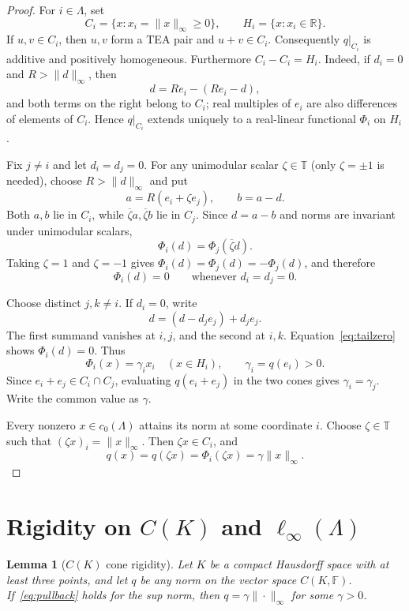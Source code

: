 \documentclass[11pt]{article}
\newtheorem{lemma}[theorem]{Lemma}
\newcommand{\F}{\mathbb F}
\newcommand{\Torus}{\mathbb T}
\begin{document}
\begin{proof}
For $i\in\Lambda$, set
\[
 C_i=\{x:x_i=\|x\|_\infty\ge0\},\qquad
 H_i=\{x:x_i\in\mathbb R\}.
\]
If $u,v\in C_i$, then $u,v$ form a TEA pair and $u+v\in C_i$.
Consequently $q|_{C_i}$ is additive and positively homogeneous.
Furthermore $C_i-C_i=H_i$.  Indeed, if $d_i=0$ and
$R>\|d\|_\infty$, then
\[
 d=Re_i-(Re_i-d),
\]
and both terms on the right belong to $C_i$; real multiples of $e_i$ are
also differences of elements of $C_i$.  Hence $q|_{C_i}$ extends uniquely to
a real-linear functional $\Phi_i$ on $H_i$.

Fix $j\ne i$ and let $d_i=d_j=0$.  For any unimodular scalar
$\zeta\in\Torus$ (only $\zeta=\pm1$ is needed), choose
$R>\|d\|_\infty$ and put
\[
 a=R(e_i+\zeta e_j),\qquad b=a-d.
\]
Both $a,b$ lie in $C_i$, while $\overline\zeta a,\overline\zeta b$ lie in
$C_j$.  Since $d=a-b$ and norms are invariant under unimodular scalars,
\begin{equation}\label{eq:phasecompare}
 \Phi_i(d)=\Phi_j(\overline\zeta d).
\end{equation}
Taking $\zeta=1$ and $\zeta=-1$ gives
$\Phi_i(d)=\Phi_j(d)=-\Phi_j(d)$, and therefore
\begin{equation}\label{eq:tailzero}
 \Phi_i(d)=0\qquad\text{whenever }d_i=d_j=0.
\end{equation}

Choose distinct $j,k\ne i$.  If $d_i=0$, write
\[
 d=(d-d_je_j)+d_je_j.
\]
The first summand vanishes at $i,j$, and the second at $i,k$.
Equation~\eqref{eq:tailzero} shows $\Phi_i(d)=0$.  Thus
\[
 \Phi_i(x)=\gamma_i x_i\quad(x\in H_i),
 \qquad \gamma_i=q(e_i)>0.
\]
Since $e_i+e_j\in C_i\cap C_j$, evaluating $q(e_i+e_j)$ in the two cones
gives $\gamma_i=\gamma_j$.  Write the common value as $\gamma$.

Every nonzero $x\in c_0(\Lambda)$ attains its norm at some coordinate $i$.
Choose $\zeta\in\Torus$ such that $(\zeta x)_i=\|x\|_\infty$.  Then
$\zeta x\in C_i$, and
\[
 q(x)=q(\zeta x)=\Phi_i(\zeta x)
 =\gamma\|x\|_\infty.
\]
\end{proof}

\section{Rigidity on \texorpdfstring{$C(K)$ and $\ell_\infty(\Lambda)$}{C(K) and ell-infinity(Lambda)}}

\begin{lemma}[$C(K)$ cone rigidity]\label{lem:CK}
Let $K$ be a compact Hausdorff space with at least three points, and let $q$
be any norm on the vector space $C(K,\F)$.  If~\eqref{eq:pullback} holds for
the sup norm, then $q=\gamma\|\cdot\|_\infty$ for some $\gamma>0$.
\end{lemma}
\end{document}

